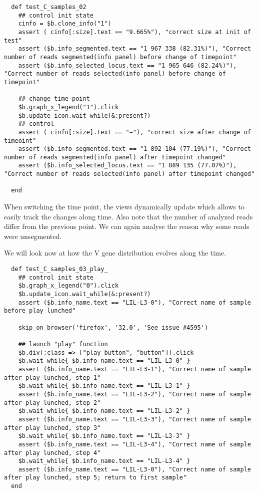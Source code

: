 \begin{verbatim}
  def test_C_samples_02
    ## control init state
    cinfo = $b.clone_info("1")
    assert ( cinfo[:size].text == "9.665%"), "correct size at init of test"
    assert ($b.info_segmented.text == "1 967 338 (82.31%)"), "Correct number of reads segmented(info panel) before change of timepoint"
    assert ($b.info_selected_locus.text == "1 965 646 (82.24%)"), "Correct number of reads selected(info panel) before change of timepoint"

    ## change time point
    $b.graph_x_legend("1").click
    $b.update_icon.wait_while(&:present?)
    ## control
    assert ( cinfo[:size].text == "−"), "correct size after change of timeoint"
    assert ($b.info_segmented.text == "1 892 104 (77.19%)"), "Correct number of reads segmented(info panel) after timepoint changed"
    assert ($b.info_selected_locus.text == "1 889 135 (77.07%)"), "Correct number of reads selected(info panel) after timepoint changed"

  end
\end{verbatim}

When switching the time point, the views dynamically update which allows to
easily track the changes along time. Also note that the number of analyzed
reads differ from the previous point. We can again analyse the reason why some
reads were unsegmented.


\bigskip

We will look now at how the V gene distribution evolves along the time.
\begin{verbatim}
  def test_C_samples_03_play_
    ## control init state
    $b.graph_x_legend("0").click
    $b.update_icon.wait_while(&:present?)
    assert ($b.info_name.text == "LIL-L3-0"), "Correct name of sample before play lunched"

    skip_on_browser('firefox', '32.0', 'See issue #4595')

    ## launch "play" function
    $b.div(:class => ["play_button", "button"]).click
    $b.wait_while{ $b.info_name.text == "LIL-L3-0" }
    assert ($b.info_name.text == "LIL-L3-1"), "Correct name of sample after play lunched, step 1"
    $b.wait_while{ $b.info_name.text == "LIL-L3-1" }
    assert ($b.info_name.text == "LIL-L3-2"), "Correct name of sample after play lunched, step 2" 
    $b.wait_while{ $b.info_name.text == "LIL-L3-2" }
    assert ($b.info_name.text == "LIL-L3-3"), "Correct name of sample after play lunched, step 3"
    $b.wait_while{ $b.info_name.text == "LIL-L3-3" }
    assert ($b.info_name.text == "LIL-L3-4"), "Correct name of sample after play lunched, step 4"
    $b.wait_while{ $b.info_name.text == "LIL-L3-4" }
    assert ($b.info_name.text == "LIL-L3-0"), "Correct name of sample after play lunched, step 5; return to first sample"
  end
\end{verbatim}

